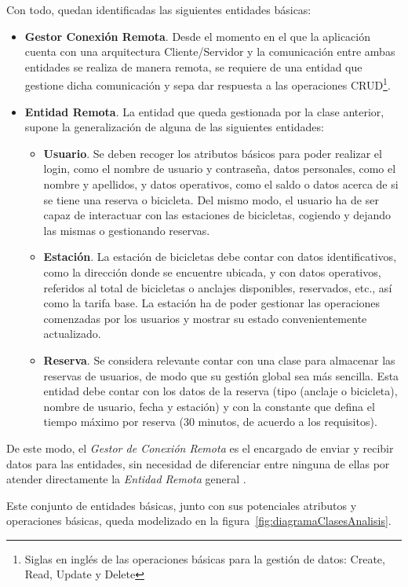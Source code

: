 Con todo, quedan identificadas las siguientes entidades básicas:

\begin{itemize}
	\item \textbf{Gestor Conexión Remota}. Desde el momento en el que la aplicación cuenta con una arquitectura Cliente/Servidor y la comunicación entre ambas entidades se realiza de manera remota, se requiere de una entidad que gestione dicha comunicación y sepa dar respuesta a las operaciones CRUD\footnote{Siglas en inglés de las operaciones básicas para la gestión de datos: Create, Read, Update y Delete}.
	\item \textbf{Entidad Remota}. La entidad que queda gestionada por la clase anterior, supone la generalización de alguna de las siguientes entidades:
	\begin{itemize}
		\item \textbf{Usuario}. Se deben recoger los atributos básicos para poder realizar el login, como el nombre de usuario y contraseña, datos personales, como el nombre y apellidos, y datos operativos, como el saldo o datos acerca de si se tiene una reserva o bicicleta. Del mismo modo, el usuario ha de ser capaz de interactuar con las estaciones de bicicletas, cogiendo y dejando las mismas o gestionando reservas.
		\item \textbf{Estación}. La estación de bicicletas debe contar con datos identificativos, como la dirección donde se encuentre ubicada, y con datos operativos, referidos al total de bicicletas o anclajes disponibles, reservados, etc., así como la tarifa base. La estación ha de poder gestionar las operaciones comenzadas por los usuarios y mostrar su estado convenientemente actualizado.
		\item \textbf{Reserva}. Se considera relevante contar con una clase para almacenar las reservas de usuarios, de modo que su gestión global sea más sencilla. Esta entidad debe contar con los datos de la reserva (tipo (anclaje o bicicleta), nombre de usuario, fecha y estación) y con la constante que defina el tiempo máximo por reserva (30 minutos, de acuerdo a los requisitos).
	\end{itemize}
\end{itemize}

De este modo, el \emph{Gestor de Conexión Remota} es el encargado de enviar y recibir datos para las entidades, sin necesidad de diferenciar entre ninguna de ellas por atender directamente la \emph{Entidad Remota} general .

Este conjunto de entidades básicas, junto con sus potenciales atributos y operaciones básicas, queda modelizado en la figura~\ref{fig:diagramaClasesAnalisis}.

